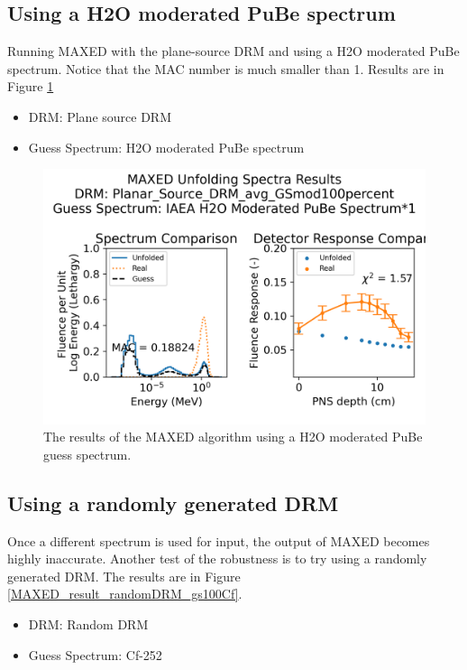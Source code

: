 \subsection*{Using a H2O moderated PuBe spectrum}
Running MAXED with the plane-source DRM and using a H2O moderated PuBe spectrum. Notice that the MAC number is much smaller than 1. Results are in Figure \ref{MAXED_result_planeDRM_gs100H2OmodPuBe}
\begin{itemize}
\item DRM: Plane source DRM
\item Guess Spectrum: H2O moderated PuBe spectrum
\end{itemize}

\begin{figure}[htb]
  \centering
  \includegraphics[scale=0.8]{images/Planar_Source_DRM_avg_GSmod100percent_IAEA H2O Moderated PuBe Spectrum_0.png}
  \caption{The results of the MAXED algorithm using a H2O moderated PuBe guess spectrum.} \label{MAXED_result_planeDRM_gs100H2OmodPuBe}
\end{figure}

\subsection*{Using a randomly generated DRM}
Once a different spectrum is used for input, the output of MAXED becomes highly inaccurate. Another test of the robustness is to try using a randomly generated DRM. The results are in Figure \ref{MAXED_result_randomDRM_gs100Cf}. 
\begin{itemize}
\item DRM: Random DRM
\item Guess Spectrum: Cf-252
\end{itemize}

